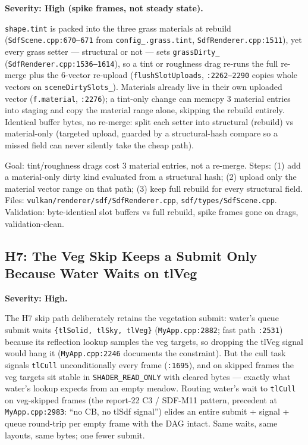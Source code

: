 \documentclass[11pt,a4paper]{article}
\begin{document}
\textbf{Severity: High (spike frames, not steady state).}

\texttt{shape.tint} is packed into the three grass materials at rebuild
(\texttt{SdfScene.cpp:670--671} from \texttt{config\_.grass.tint},
\texttt{SdfRenderer.cpp:1511}), yet every grass setter --- structural or
not --- sets \texttt{grassDirty\_} (\texttt{SdfRenderer.cpp:1536--1614}),
so a tint or roughness drag re-runs the full re-merge plus the 6-vector
re-upload (\texttt{flushSlotUploads}, \texttt{:2262--2290} copies whole
vectors on \texttt{sceneDirtySlots\_}). Materials already live in their own
uploaded vector (\texttt{f.material}, \texttt{:2276}); a tint-only change
can memcpy 3 material entries into staging and copy the material range
alone, skipping the rebuild entirely. Identical buffer bytes, no re-merge:
split each setter into structural (rebuild) vs material-only (targeted
upload, guarded by a structural-hash compare so a missed field can never
silently take the cheap path).

\begin{tcolorbox}[promptbox={Prompt --- H6: material-only grass tint path}]
Goal: tint/roughness drags cost 3 material entries, not a re-merge. Steps:
(1) add a material-only dirty kind evaluated from a structural hash;
(2) upload only the material vector range on that path; (3) keep full
rebuild for every structural field. Files:
\texttt{vulkan/renderer/sdf/SdfRenderer.cpp},
\texttt{sdf/types/SdfScene.cpp}. Validation: byte-identical slot buffers
vs full rebuild, spike frames gone on drags, validation-clean.
\end{tcolorbox}

\subsection{H7: The Veg Skip Keeps a Submit Only Because Water Waits on tlVeg}

\textbf{Severity: High.}

The H7 skip path deliberately retains the vegetation submit: water's queue
submit waits \texttt{\{tlSolid, tlSky, tlVeg\}}
(\texttt{MyApp.cpp:2882}; fast path \texttt{:2531}) because its reflection
lookup samples the veg targets, so dropping the tlVeg signal would hang it
(\texttt{MyApp.cpp:2246} documents the constraint). But the cull task
signals \texttt{tlCull} unconditionally every frame (\texttt{:1695}), and
on skipped frames the veg targets sit stable in
\texttt{SHADER\_READ\_ONLY} with cleared bytes --- exactly what water's
lookup expects from an empty meadow. Routing water's wait to
\texttt{tlCull} on veg-skipped frames (the report-22 C3 / SDF-M11 pattern,
precedent at \texttt{MyApp.cpp:2983}: ``no CB, no tlSdf signal'') elides an
entire submit + signal + queue round-trip per empty frame with the DAG
intact. Same waits, same layouts, same bytes; one fewer submit.
\end{document}
